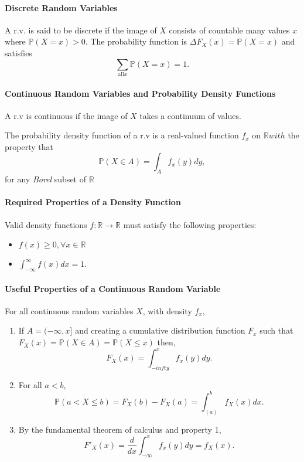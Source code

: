\paragraph{Discrete Random Variables}
A r.v. is said to be discrete if the image of \(X\) consists of 
countable many values \(x\) where \(\mathbb{P}(X = x) > 0\).
The probability function is \(\Delta F_X(x) = \mathbb{P}(X = x)\)
and satisfies
\[
    \sum_{\text{all} x} \mathbb{P} (X = x) = 1.
\]

\paragraph{Continuous Random Variables and Probability Density Functions}
A r.v is continuous if the image of \(X\) takes a continuum of values.

The probability density function of a r.v is a real-valued function
\(f_x\) on \(\mathbb{R} with\) the property that
\[
    \mathbb{P}(X \in A) = \int_{A} f_x(y)dy,
\]
for any \textit{Borel} subset of \(\mathbb{R}\)

\paragraph{Required Properties of a Density Function}
Valid density functions \(f: \mathbb{R}\to \mathbb{R}\)
must satisfy the following properties:
\begin{itemize}
    \item \(f(x) \geq 0, \forall x\in \mathbb{R}\)
    \item \(\int_{-\infty}^{\infty} f(x)dx = 1\).
\end{itemize}

\paragraph{Useful Properties of a Continuous Random Variable}
For all continuous random variables \(X\), with density \(f_x\),
\begin{enumerate}
    \item If \(A = (-\infty, x]\) and creating a cumulative distribution
    function \(F_x\) such that \(
        F_X(x) = \mathbb{P}(X\in A) = \mathbb{P}(X \leq x)
    \) then, \[
        F_X(x) = \int_{-infty}^{x} f_x(y)dy.
    \]
    \item For all \(a < b\),
    \[
        \mathbb{P}(a < X \leq b) = F_X(b) - F_X(a)
        = \int_(a)^{b} f_X(x)dx.
    \]
    \item By the fundamental theorem of calculus and property 1,
    \[
        F'_X(x) = \frac{d}{dx} \int_{-\infty}^{x} f_x(y)dy = f_X(x).
    \]
\end{enumerate}

